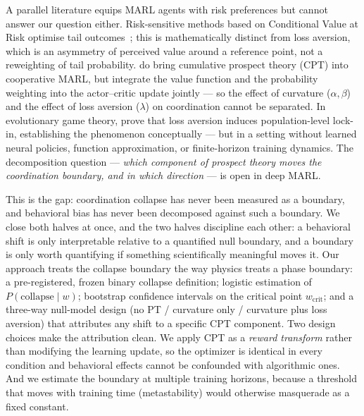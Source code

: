 \documentclass[letterpaper]{article}
\theoremstyle{plain}
\newcommand{\wcrit}{w_{\mathrm{crit}}}
\begin{document}
A parallel literature equips MARL agents with risk preferences but
cannot answer our question either.
Risk-sensitive methods based on Conditional Value at Risk optimise tail
outcomes~\citep{qiu2021rmix,xie2023riskq}; this is mathematically
distinct from loss aversion, which is an asymmetry of perceived value
around a reference point, not a reweighting of tail probability.
\citet{lalmohammed2025} do bring cumulative prospect theory (CPT) into
cooperative MARL, but integrate the value function and the probability
weighting into the actor--critic update jointly --- so the effect of
curvature ($\alpha,\beta$) and the effect of loss aversion ($\lambda$)
on coordination cannot be separated.
In evolutionary game theory, \citet{mengesha2025} prove that loss
aversion induces population-level lock-in, establishing the phenomenon
conceptually --- but in a setting without learned neural policies,
function approximation, or finite-horizon training dynamics.
The decomposition question --- \emph{which component of prospect theory
moves the coordination boundary, and in which direction} --- is open in
deep MARL.

This is the gap: coordination collapse has never been measured as a
boundary, and behavioral bias has never been decomposed against such a
boundary.
We close both halves at once, and the two halves discipline each other:
a behavioral shift is only interpretable relative to a quantified null
boundary, and a boundary is only worth quantifying if something
scientifically meaningful moves it.
Our approach treats the collapse boundary the way physics treats a phase
boundary: a pre-registered, frozen binary collapse definition; logistic
estimation of $P(\mathrm{collapse} \mid w)$; bootstrap confidence
intervals on the critical point $\wcrit$; and a three-way null-model
design (no PT / curvature only / curvature plus loss aversion) that
attributes any shift to a specific CPT component.
Two design choices make the attribution clean.
We apply CPT as a \emph{reward transform} rather than modifying the
learning update, so the optimizer is identical in every condition and
behavioral effects cannot be confounded with algorithmic ones.
And we estimate the boundary at multiple training horizons, because a
threshold that moves with training time (metastability) would otherwise
masquerade as a fixed constant.
\end{document}
